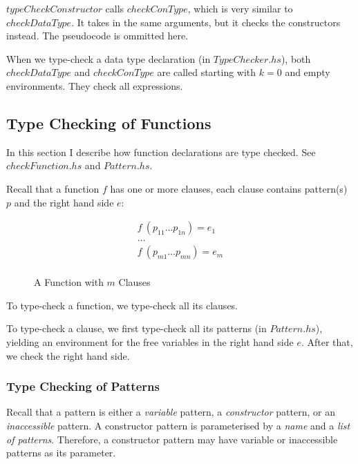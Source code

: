 $typeCheckConstructor$ calls $checkConType$, which is very similar to $checkDataType$. It takes in the same arguments, but it checks the constructors instead. The pseudocode is ommitted here.

When we type-check a data type declaration (in $TypeChecker.hs$), both $checkDataType$ and $checkConType$ are called starting with $k=0$ and empty environments. They check all expressions.

\subsection{Type Checking of Functions}

In this section I describe how function declarations are type checked. See \emph{$checkFunction.hs$} and \emph{$Pattern.hs$}.

Recall that a function $f$ has one or more clauses, each clause contains pattern(s) $p$ and the right hand side $e$:

\begin{figure}[H]
  \begin{equation*}
    \begin{aligned}
      f \: (p_{11} \dots p_{1n}) = e_1 \\
      \dots                            \\
      f \: (p_{m1} \dots p_{mn}) = e_m \\
    \end{aligned}
  \end{equation*}
  \caption{A Function with $m$ Clauses}
\end{figure}

To type-check a function, we type-check all its clauses.

To type-check a clause, we first type-check all its patterns (in $Pattern.hs$), yielding an environment for the free variables in the right hand side $e$. After that, we check the right hand side.

\subsubsection{Type Checking of Patterns}
\label{sec:typeCheckPattern}

Recall that a pattern is either a \emph{variable} pattern, a \emph{constructor} pattern, or an \emph{inaccessible} pattern. A constructor pattern is parameterised by a \emph{name} and a \emph{list of patterns}. Therefore, a constructor pattern may have variable or inaccessible patterns as its parameter.

